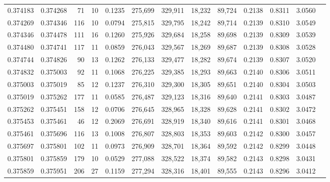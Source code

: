 \begin{tabular}{rrrrrrrrrrrrr}
0.374183 & 0.374268 &    71 &  10 &                                     0.1235 & 275,699 & 329,911 &  18,232 &  89,724 & 0.2138 & 0.8311 & 3.0560 \\
0.374269 & 0.374346 &   116 &  10 &                                     0.0794 & 275,815 & 329,795 &  18,242 &  89,714 & 0.2139 & 0.8310 & 3.0549 \\
0.374346 & 0.374478 &   111 &  16 &                                     0.1260 & 275,926 & 329,684 &  18,258 &  89,698 & 0.2139 & 0.8309 & 3.0539 \\
0.374480 & 0.374741 &   117 &  11 &                                     0.0859 & 276,043 & 329,567 &  18,269 &  89,687 & 0.2139 & 0.8308 & 3.0528 \\
0.374744 & 0.374826 &    90 &  13 &                                     0.1262 & 276,133 & 329,477 &  18,282 &  89,674 & 0.2139 & 0.8307 & 3.0520 \\
0.374832 & 0.375003 &    92 &  11 &                                     0.1068 & 276,225 & 329,385 &  18,293 &  89,663 & 0.2140 & 0.8306 & 3.0511 \\
0.375003 & 0.375019 &    85 &  12 &                                     0.1237 & 276,310 & 329,300 &  18,305 &  89,651 & 0.2140 & 0.8304 & 3.0503 \\
0.375019 & 0.375262 &   177 &  11 &                                     0.0585 & 276,487 & 329,123 &  18,316 &  89,640 & 0.2141 & 0.8303 & 3.0487 \\
0.375262 & 0.375451 &   158 &  12 &                                     0.0706 & 276,645 & 328,965 &  18,328 &  89,628 & 0.2141 & 0.8302 & 3.0472 \\
0.375453 & 0.375461 &    46 &  12 &                                     0.2069 & 276,691 & 328,919 &  18,340 &  89,616 & 0.2141 & 0.8301 & 3.0468 \\
0.375461 & 0.375696 &   116 &  13 &                                     0.1008 & 276,807 & 328,803 &  18,353 &  89,603 & 0.2142 & 0.8300 & 3.0457 \\
0.375697 & 0.375801 &   102 &  11 &                                     0.0973 & 276,909 & 328,701 &  18,364 &  89,592 & 0.2142 & 0.8299 & 3.0448 \\
0.375801 & 0.375859 &   179 &  10 &                                     0.0529 & 277,088 & 328,522 &  18,374 &  89,582 & 0.2143 & 0.8298 & 3.0431 \\
0.375859 & 0.375951 &   206 &  27 &                                     0.1159 & 277,294 & 328,316 &  18,401 &  89,555 & 0.2143 & 0.8296 & 3.0412 \\

\end{tabular}
